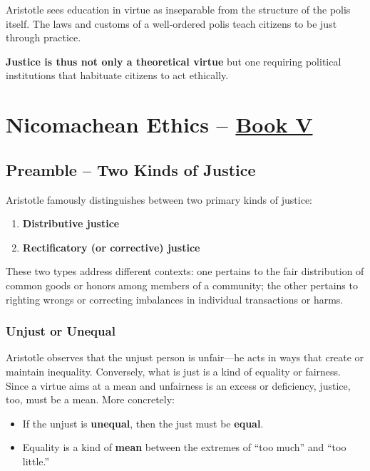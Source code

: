             \begin{remark}
                Aristotle sees education in virtue as inseparable from the structure of the polis itself. The laws and customs of a well-ordered polis teach citizens to be just through practice.
                
                \textbf{Justice is thus not only a theoretical virtue} but one requiring political institutions that habituate citizens to act ethically.
            \end{remark}

        \section[Nicomachean Ethics -- Book V]{Nicomachean Ethics -- \href{https://drive.google.com/file/d/1uxgtqKid4c8Lfgl5nKP3dV5EZDR9dZ-L/view?usp=share_link}{Book V}}

            \subsection{Preamble -- Two Kinds of Justice}

                Aristotle famously distinguishes between two primary kinds of justice:
                \begin{enumerate}
                  \item \textbf{Distributive justice}
                  \item \textbf{Rectificatory (or corrective) justice}
                \end{enumerate}

                These two types address different contexts: one pertains to the fair distribution of common goods or honors among members of a community; the other pertains to righting wrongs or correcting imbalances in individual transactions or harms.

                \subsubsection{Unjust or Unequal}

                    Aristotle observes that the unjust person is unfair---he acts in ways that create or maintain inequality. Conversely, what is just is a kind of equality or fairness. Since a virtue aims at a mean and unfairness is an excess or deficiency, justice, too, must be a mean. More concretely:
                    \begin{itemize}
                      \item If the unjust is \textbf{unequal}, then the just must be \textbf{equal}.
                      \item Equality is a kind of \textbf{mean} between the extremes of ``too much'' and ``too little.''
                    \end{itemize}

